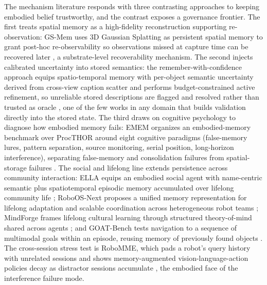 The mechanism literature responds with three contrasting approaches to keeping embodied belief trustworthy, and the contrast exposes a governance frontier. The first treats spatial memory as a high-fidelity reconstruction supporting re-observation: GS-Mem uses 3D Gaussian Splatting as persistent spatial memory to grant post-hoc re-observability so observations missed at capture time can be recovered later \citep{lu2026gsmem}, a substrate-level recoverability mechanism. The second injects calibrated uncertainty into stored semantics: the remember-with-confidence approach equips spatio-temporal memory with per-object semantic uncertainty derived from cross-view caption scatter and performs budget-constrained active refinement, so unreliable stored descriptions are flagged and resolved rather than trusted as oracle \citep{zhang2026rememberconfidence}, one of the few works in any domain that builds validation directly into the stored state. The third draws on cognitive psychology to diagnose how embodied memory fails: EMEM organizes an embodied-memory benchmark over ProcTHOR around eight cognitive paradigms (false-memory lures, pattern separation, source monitoring, serial position, long-horizon interference), separating false-memory and consolidation failures from spatial-storage failures \citep{rasheed2026emem}. The social and lifelong line extends persistence across community interaction: ELLA equips an embodied social agent with name-centric semantic plus spatiotemporal episodic memory accumulated over lifelong community life \citep{zhang2025ella}; RoboOS-Next proposes a unified memory representation for lifelong adaptation and scalable coordination across heterogeneous robot teams \citep{tan2025roboosnext}; MindForge frames lifelong cultural learning through structured theory-of-mind shared across agents \citep{lica2024mindforge}; and GOAT-Bench tests navigation to a sequence of multimodal goals within an episode, reusing memory of previously found objects \citep{khanna2024goatbench}. The cross-session stress test is RoboMME, which pads a robot's query history with unrelated sessions and shows memory-augmented vision-language-action policies decay as distractor sessions accumulate \citep{rathi2026robomme}, the embodied face of the interference failure mode.

